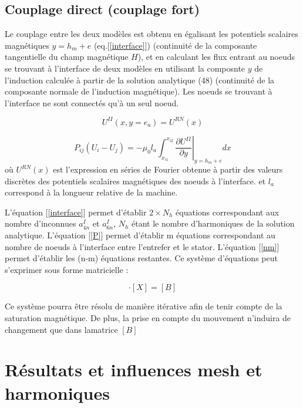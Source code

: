 \subsection{Couplage direct (couplage fort)}
Le couplage entre les deux modèles est obtenu en égalisant les potentiels scalaires magnétiques $y=h_m+e$ (eq.[\ref{interface}]) (continuité de la composante tangentielle du champ magnétique $H$), et en calculant les flux entrant au noeuds se trouvant à l'interface de deux modèles en utilisant la composnte $y$ de l'induction calculée à partir de la solution analytique (48) (continuité de la composante normale de l'induction magnétique). Les noeuds se trouvant à l'interface ne sont connectés qu'à un seul noeud.
\begin{center}
\begin{equation}
    \label{interface}
    U^{II}(x,y=e_a)=U^{RN}(x)
\end{equation}
\end{center}

$$
    \label{P}
    P_{ij}(U_i-U_j) = -\mu_0l_a\int_{x_{i1}}^{x_{i2}}\left. \frac{\partial U^{II}}{\partial y}\right|_{y=h_m+e} dx
$$
où $U^{RN}(x)$ est l'expression en séries de Fourier obtenue à partir des valeurs discrètes des potentiels scalaires magnétiques des noeuds à l'interface. et $l_a$ correspond à la longueur relative de la machine.

L'équation [\ref{interface}] permet d'établir $2\times N_h$ équations  correspondant aux nombre d'inconnues $a_{4n}^I$ et $a_{6n}^I$, $N_h$ étant le nombre d'harmoniques de la solution analytique. L'équation [\ref{P}] permet d'établir m équations correspondant au nombre de noeuds à l'interface entre l'entrefer et le stator. L'équation [\ref{nm}] permet d'établir les (n-m) équations restantes. Ce système d'équations peut s'exprimer sous forme matricielle : 

\begin{equation}
    [A]\cdot[X]=[B]
\end{equation}


Ce système pourra être résolu de manière itérative afin de tenir compte de la saturation magnétique. De plus, la prise en compte du mouvement n'induira de changement que dans lamatrice $[B]$



\section{Résultats et influences mesh et harmoniques}
